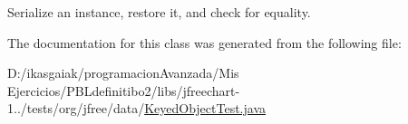 Serialize an instance, restore it, and check for equality. 

The documentation for this class was generated from the following file\+:\begin{DoxyCompactItemize}
\item 
D\+:/ikasgaiak/programacion\+Avanzada/\+Mis Ejercicios/\+P\+B\+Ldefinitibo2/libs/jfreechart-\/1../tests/org/jfree/data/\mbox{\hyperlink{_keyed_object_test_8java}{Keyed\+Object\+Test.\+java}}\end{DoxyCompactItemize}

